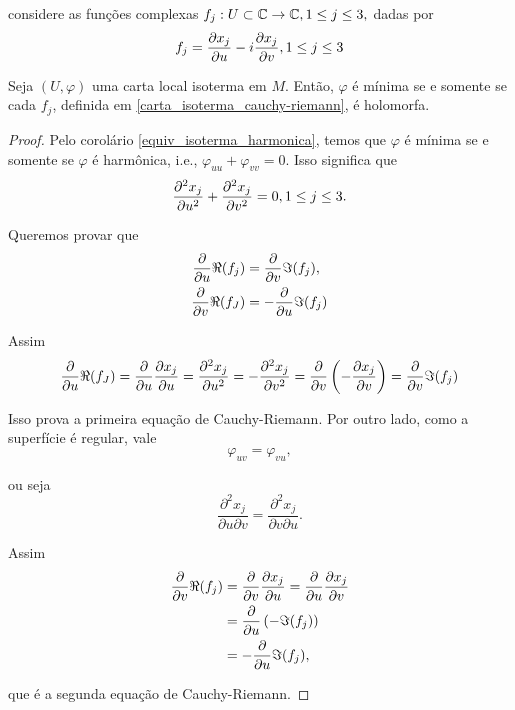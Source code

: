 considere as funções complexas $f_j: U \subset \mathbb{C} \rightarrow \mathbb{C}, 1 \leq j \leq 3,$ dadas por
\begin{equation}\label{carta_isoterma_cauchy-riemann}
	f_j = \frac{\partial x_j}{\partial u} - i \frac{\partial x_j}{\partial v}, 1 \leq j \leq 3
\end{equation}

\begin{lema}
	Seja $(U, \varphi)$ uma carta local isoterma em $M$. Então, $\varphi$ é mínima se e somente se cada $f_j$, definida em \ref{carta_isoterma_cauchy-riemann}, é holomorfa.
\end{lema}

\begin{proof}
	Pelo corolário \ref{equiv_isoterma_harmonica}, temos que $\varphi$ é mínima se e somente se $\varphi$ é harmônica, i.e., $\varphi_{uu} + \varphi_{vv} = 0$. Isso significa que
	\begin{equation*}
		\frac{\partial^2 x_j}{\partial u^2} + \frac{\partial^2 x_j}{\partial v^2} = 0, 1 \leq j \leq 3.
	\end{equation*}
	
	Queremos provar que
	\begin{align*}
		\frac{\partial}{\partial u} \Re(f_j) &= \frac{\partial}{\partial v} \Im(f_j),\\
		\frac{\partial}{\partial v} \Re(f_J) &= - \frac{\partial}{\partial u} \Im(f_j)
	\end{align*}
	
	Assim
	\begin{multline*}
		\frac{\partial}{\partial u} \Re(f_J) = \frac{\partial}{\partial u} \frac{\partial x_j}{\partial u} = \frac{\partial^2 x_j}{\partial u^2} = - \frac{\partial^2 x_j}{\partial v^2} = \frac{\partial}{\partial v} \left( - \frac{\partial x_j}{\partial v} \right) = \frac{\partial}{\partial v} \Im(f_j)
	\end{multline*}
	
	Isso prova a primeira equação de Cauchy-Riemann. Por outro lado, como a superfície é regular, vale
	\begin{equation*}
		\varphi_{uv} = \varphi_{vu},
	\end{equation*}
	
	ou seja
	\begin{equation*}
		\frac{\partial^2 x_j}{\partial u \partial v} = \frac{\partial^2 x_j}{\partial v \partial u}.
	\end{equation*}
	
	Assim
	\begin{align*}
		\frac{\partial}{\partial v} \Re(f_j) &= \frac{\partial}{\partial v} \frac{\partial x_j}{\partial u} = \frac{\partial}{\partial u} \frac{\partial x_j}{\partial v}\\
		&= \frac{\partial}{\partial u} \left( - \Im(f_j) \right)\\
		&= - \frac{\partial}{\partial u} \Im(f_j),
	\end{align*}
	
	que é a segunda equação de Cauchy-Riemann.
\end{proof}

